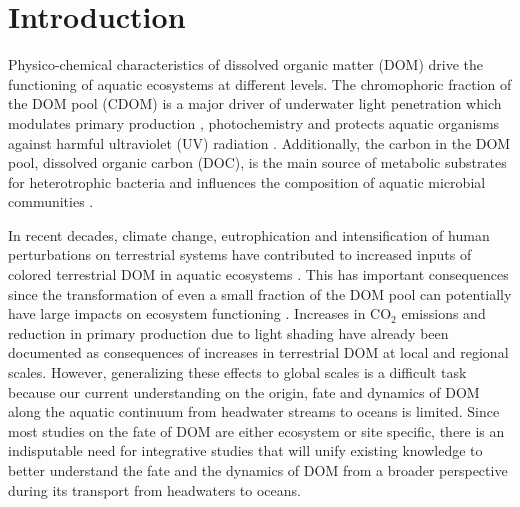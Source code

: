 
\section*{Introduction}
\label{sec:Introduction}

Physico-chemical characteristics of dissolved organic matter (DOM) drive the functioning of aquatic ecosystems at different levels. The chromophoric fraction of the DOM pool (CDOM) is a major driver of underwater light penetration \citep{Kirk1994} which modulates primary production \citep{Markager2004, Thrane2014, Seekell2015}, photochemistry and protects aquatic organisms against harmful ultraviolet (UV) radiation \citep{Hader2011}. Additionally, the carbon in the DOM pool, dissolved organic carbon (DOC), is the main source of metabolic substrates for heterotrophic bacteria and influences the composition of aquatic microbial communities \citep{Findlay2003}.

In recent decades, climate change, eutrophication and intensification of human perturbations on terrestrial systems have contributed to increased inputs of colored terrestrial DOM in aquatic ecosystems \citep{Roulet2006, Massicotte2013RSE, Weyhenmeyer2014, Haaland2010}. This has important consequences since the transformation of even a small fraction of the DOM pool can potentially have large impacts on ecosystem functioning \citep{Prairie2008}. Increases in CO$_2$ emissions \citep{Lapierre2013} and reduction in primary production due to light shading \citep{Seekell2015, Thrane2014} have already been documented as consequences of increases in terrestrial DOM at local and regional scales. However, generalizing these effects to global scales is a difficult task because our current understanding on the origin, fate and dynamics of DOM along the aquatic continuum from headwater streams to oceans is limited. Since most studies on the fate of DOM are either ecosystem or site specific, there is an indisputable need for integrative studies that will unify existing knowledge to better understand the fate and the dynamics of DOM from a broader perspective during its transport from headwaters to oceans.

